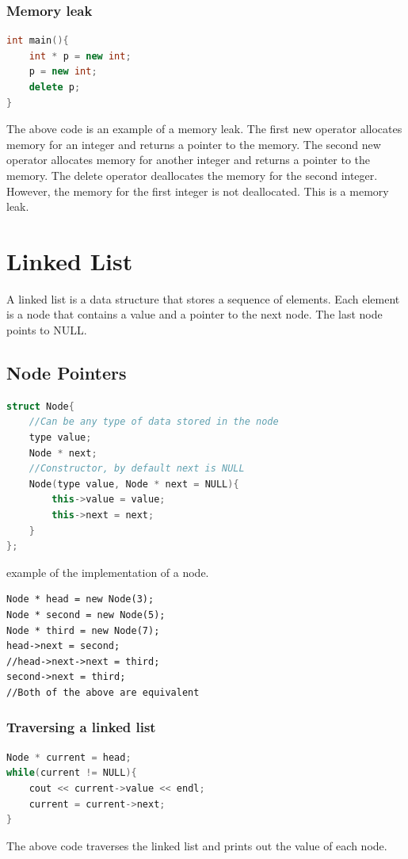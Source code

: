 \documentclass[letterpaper,12pt]{article}
\begin{document}
\subsubsection{Memory leak}
\begin{lstlisting}[language=C++]
int main(){
    int * p = new int;
    p = new int;
    delete p;
}
\end{lstlisting}
The above code is an example of a memory leak. The first new operator allocates memory for an integer and returns a pointer to the memory. The second new operator allocates memory for another integer and returns a pointer to the memory. The delete operator deallocates the memory for the second integer. However, the memory for the first integer is not deallocated. This is a memory leak.

\section{Linked List}
A linked list is a data structure that stores a sequence of elements. Each element is a node that contains a value and a pointer to the next node. The last node points to NULL.

\subsection{Node Pointers}
\begin{lstlisting}[language=C++]
struct Node{
    //Can be any type of data stored in the node
    type value;
    Node * next;
    //Constructor, by default next is NULL
    Node(type value, Node * next = NULL){
        this->value = value;
        this->next = next;
    }
};
\end{lstlisting}
example of the implementation of a node.
\begin{lstlisting}
Node * head = new Node(3);
Node * second = new Node(5);
Node * third = new Node(7);
head->next = second;
//head->next->next = third;
second->next = third;
//Both of the above are equivalent
\end{lstlisting}
\subsubsection{Traversing a linked list}
\begin{lstlisting}[language=C++]
Node * current = head;
while(current != NULL){
    cout << current->value << endl;
    current = current->next;
}
\end{lstlisting}
The above code traverses the linked list and prints out the value of each node.
\end{document}
